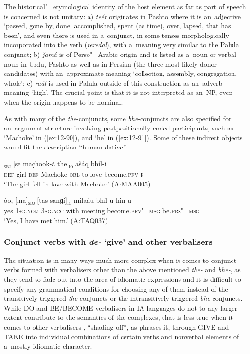 The historical"=etymological identity of the host element as far as part of speech is concerned is not unitary: a) \textit{teér} originates in Pashto where it is an~adjective `passed, gone by, done, accomplished, spent (as time), over, lapsed, that has been', and even there is used in a~conjunct, in some tenses morphologically incorporated into the verb (\textit{teredal}), with a~meaning very similar to the Palula conjunct; b) \textit{ǰamá} is of Perso"=Arabic origin and is listed as a~noun or verbal noun in Urdu, Pashto as well as in Persian (the three most likely donor candidates) with an~approximate meaning `collection, assembly, congregation, whole'; c) \textit{raál} is used in Palula outside of this construction as an~adverb meaning `high'. The crucial point is that it is not interpreted as an~NP, even when the origin happens to be nominal. 


As with many of the \textit{the}-conjuncts, some \textit{bhe}-conjuncts are also specified for an~argument structure involving postpositionally coded participants, such as `Machoke' in (\ref{ex:12-90}), and `he' in (\ref{ex:12-91}). Some of these indirect objects would fit the description ``human dative''. 

\begin{exe}
\ex
\label{ex:12-90}
\gll [se phaí]\textsubscript{\textsc{sbj}} [se mac̣hook-á the]\textsubscript{\textsc{io}} ašáq bhíl-i \\
\textsc{def} girl \textsc{def} Machoke-\textsc{obl} to love  become.\textsc{pfv-f} \\
\glt `The girl fell in love with Machoke.' (A:MAA005)
\end{exe}
\begin{exe}
\ex
\label{ex:12-91}
\gll óo, [ma]\textsubscript{\textsc{sbj}} [tas sanɡí]\textsubscript{\textsc{io}} milaáu bhíl-u hin-u \\
yes \textsc{1sg.nom} \textsc{3sg.acc} with meeting become.\textsc{pfv"=msg}  be.\textsc{prs"=msg} \\
\glt `Yes, I have met him.' (A:TAQ037)
\end{exe}

\subsubsection*{Conjunct verbs with \textit{de-} `give' and other verbalisers}

The situation is in many ways much more complex when it comes to conjunct verbs formed with
verbalisers other than the above mentioned \textit{the-} and \textit{bhe-}, as they tend to fade out
into the area of idiomatic expressions and it is difficult to specify any grammatical conditions for
choosing any of them instead of the transitively triggered \textit{the}-conjuncts or the
intransitively triggered \textit{bhe}-conjuncts. While DO and BE/BECOME verbalisers in IA
languages do not to any larger extent contribute to the semantics of the complexes, that is less
true when it comes to other verbalisers \citep[78--79]{gambhir1993}, ``shading off'', as
\citet[157]{masica1993} phrases it, through GIVE and TAKE into individual combinations of certain
verbs and nonverbal elements of a~mostly idiomatic character.



